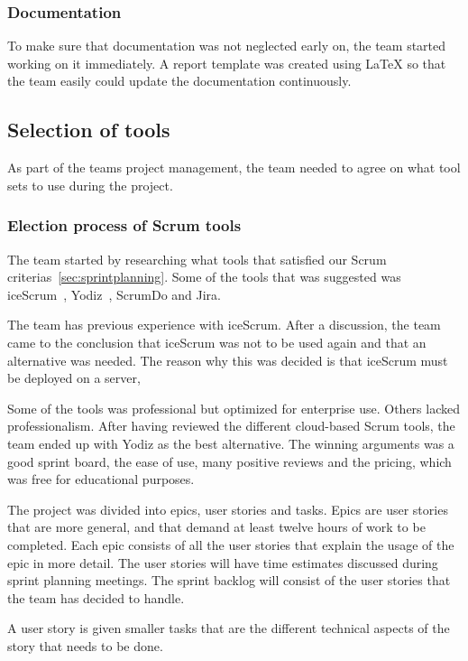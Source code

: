 \subsubsection{Documentation}
To make sure that documentation was not neglected early on, the team started working on it immediately. A report template was created using LaTeX so that the team easily could update the documentation continuously.

\subsection{Selection of tools}
As part of the teams project management, the team needed to agree on what tool sets to use during the project.

\subsubsection{Election process of Scrum tools}
\label{sec:scrumtools}
The team started by researching what tools that satisfied our Scrum criterias~\ref{sec:sprintplanning}. Some of the tools that was suggested was iceScrum~\cite{icescrum}, Yodiz~\cite{yodiz}, ScrumDo and Jira.

The team has previous experience with iceScrum. After a discussion, the team came to the conclusion that iceScrum was not to be used again and that an alternative was needed. The reason why this was decided is that iceScrum must be deployed on a server, 

Some of the tools was professional but optimized for enterprise use. Others lacked professionalism. After having reviewed the different cloud-based Scrum tools, the team ended up with Yodiz as the best alternative. The winning arguments was a good sprint board, the ease of use, many positive reviews and the pricing, which was free for educational purposes.

The project was divided into epics, user stories and tasks. Epics are user stories that are more general, and that demand at least twelve hours of work to be completed. Each epic consists of all the user stories that explain the usage of the epic in more detail.
The user stories will have time estimates discussed during sprint planning meetings.
The sprint backlog will consist of the user stories that the team has decided to handle.

A user story is given smaller tasks that are the different technical aspects of the story that needs to be done.

